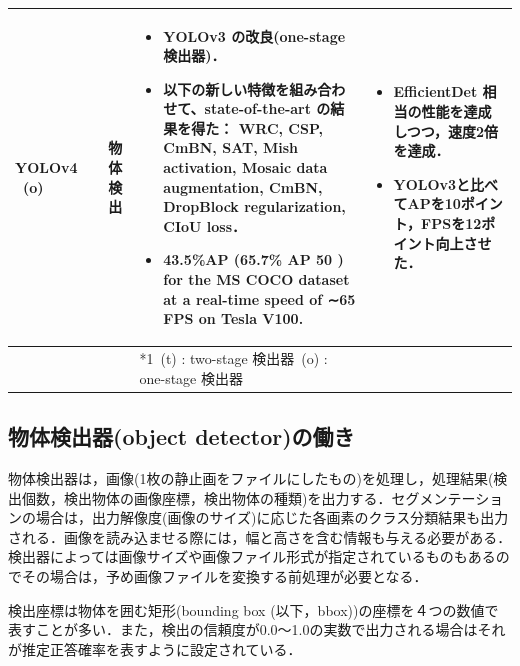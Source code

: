 \documentclass[originalpaper,fleqn]{jsaiart}     %
\begin{document}
\begin{table}
\begin{center}
\begin{tabularx}{\linewidth}{Xp{1.5cm}Xp{7cm}X}
            YOLOv4 \ (o) & \cite{BWL20} & 物体検出 & 
            \begin{itemize}
                \vspace{-0.7\baselineskip}
                \setlength{\leftskip}{-3mm}
                \item YOLOv3 の改良(one-stage 検出器)．
                \item 以下の新しい特徴を組み合わせて、state-of-the-art の結果を得た： WRC, CSP, CmBN, SAT, Mish activation, Mosaic data augmentation, CmBN, DropBlock regularization, CIoU loss．
                \item 43.5\%AP (65.7\% AP 50 ) for the MS COCO dataset at a real-time speed of ∼65 FPS on Tesla V100.
            \end{itemize}
            &
            \begin{itemize}
                \vspace{-0.7\baselineskip}
                \setlength{\leftskip}{-3mm}
                \item EfficientDet 相当の性能を達成しつつ，速度2倍を達成．
                \item YOLOv3と比べてAPを10ポイント，FPSを12ポイント向上させた．
            \end{itemize}
            \\
            \bottomrule
             &  &  & *1\ (t) : two-stage 検出器\quad *2\ (o) : one-stage 検出器 &  \\
        \end{tabularx}
    \end{center}
\end{table}%

\subsection{物体検出器(object detector)の働き}
物体検出器は，画像(1枚の静止画をファイルにしたもの)を処理し，処理結果(検出個数，検出物体の画像座標，検出物体の種類)を出力する．セグメンテーションの場合は，出力解像度(画像のサイズ)に応じた各画素のクラス分類結果も出力される．画像を読み込ませる際には，幅と高さを含む情報も与える必要がある．検出器によっては画像サイズや画像ファイル形式が指定されているものもあるのでその場合は，予め画像ファイルを変換する前処理が必要となる．

検出座標は物体を囲む矩形(bounding box (以下，bbox))の座標を４つの数値で表すことが多い．また，検出の信頼度が0.0〜1.0の実数で出力される場合はそれが推定正答確率を表すように設定されている．
\end{document}
